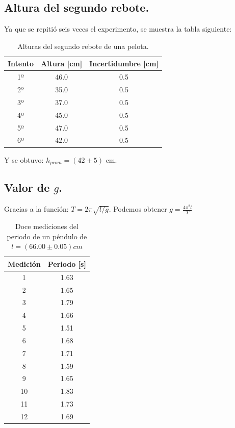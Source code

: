 \documentclass{article}
\begin{document}
\subsection{Altura del segundo rebote.}
Ya que se repitió seis veces el experimento, se muestra la tabla siguiente:
\begin{table}[H]
  \centering
    \begin{tabular}{|c|c|c|} \hline
    Intento & Altura [cm] & Incertidumbre [cm] \\ \hline
    1º    & 46.0    & 0.5 \\ \hline
    2º    & 35.0    & 0.5 \\ \hline
    3º    & 37.0    & 0.5 \\ \hline
    4º    & 45.0    & 0.5 \\ \hline
    5º    & 47.0    & 0.5 \\ \hline
    6º    & 42.0    & 0.5 \\ \hline
    \end{tabular}%
\caption{Alturas del segundo rebote de una pelota.}
\end{table}%

Y se obtuvo: $h_{prom} = (42 \pm 5)$ cm.

\subsection{Valor de $g$.}
Gracias a la función: $T = 2\pi \sqrt{l/g}$. Podemos obtener $g = \frac{4\pi^2l}{T}$

\begin{table}[H]
  \centering
    \begin{tabular}{|c|c|} \hline
    Medición & Periodo [s] \\ \hline
    1     & 1.63 \\ \hline
    2     & 1.65 \\ \hline
    3     & 1.79 \\ \hline
    4     & 1.66 \\ \hline
    5     & 1.51 \\ \hline
    6     & 1.68 \\ \hline
    7     & 1.71 \\ \hline
    8     & 1.59 \\ \hline
    9     & 1.65 \\ \hline
    10    & 1.83 \\ \hline
    11    & 1.73 \\ \hline
    12    & 1.69 \\ \hline
    \end{tabular}%
\caption{Doce mediciones del periodo de un péndulo de $l = (66.00\pm0.05)cm$}
\end{table}%
\end{document}
